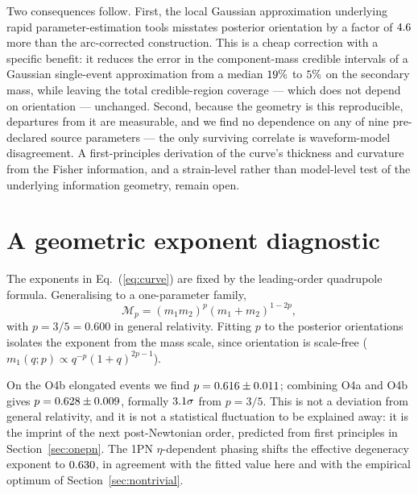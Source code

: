 \documentclass[aps,preprint,amsmath,amssymb,nofootinbib,superscriptaddress]{revtex4-2}
\begin{document}
Two consequences follow. First, the local Gaussian approximation underlying rapid parameter-estimation
tools misstates posterior orientation by a factor of $4.6$ more than the arc-corrected
construction. This is a cheap correction with a specific benefit: it reduces the error in the
component-mass credible intervals of a Gaussian single-event approximation from a median $19\%$
to $5\%$ on the secondary mass, while leaving the total credible-region coverage --- which does
not depend on orientation --- unchanged. Second,
because the geometry is this reproducible, departures from it are measurable, and we find no dependence on
any of nine pre-declared source parameters --- the only surviving correlate is waveform-model disagreement.
A first-principles derivation of the curve's thickness and curvature from the Fisher information, and a
strain-level rather than model-level test of the underlying information geometry, remain open.

\appendix

\section{A geometric exponent diagnostic}
\label{app:exponent}
The exponents in Eq.~(\ref{eq:curve}) are fixed by the leading-order quadrupole formula. Generalising to a
one-parameter family,
\begin{equation}
\mathcal{M}_p = (m_1 m_2)^p (m_1+m_2)^{1-2p},
\end{equation}
with $p = 3/5 = 0.600$ in general relativity. Fitting $p$ to the posterior orientations isolates the exponent from the mass scale, since orientation
is scale-free ($m_1(q;p) \propto q^{-p}(1+q)^{2p-1}$).

On the O4b elongated events we find $p = 0.616 \pm 0.011$; combining O4a and O4b gives
$p = 0.628 \pm 0.009$, formally $3.1\sigma$ from $p=3/5$. This is not a deviation
from general relativity, and it is not a statistical fluctuation to be explained away: it is the imprint
of the next post-Newtonian order, predicted from first principles in Section~\ref{sec:onepn}. The 1PN
$\eta$-dependent phasing shifts the effective degeneracy exponent to $0.630$, in agreement with the
fitted value here and with the empirical optimum of Section~\ref{sec:nontrivial}.
\end{document}
